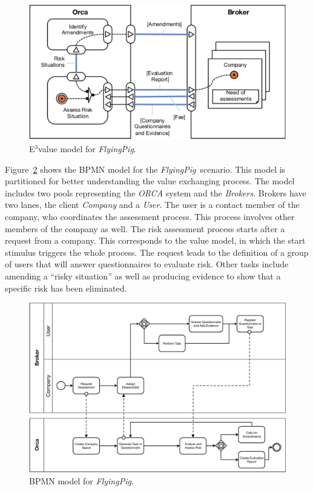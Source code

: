\documentclass{singlecol-new}
\theoremstyle{TH}{
\newtheorem{lemma}{Lemma}
\newtheorem{theorem}[lemma]{Theorem}
\newtheorem{corrolary}[lemma]{Corrolary}
\newtheorem{conjecture}[lemma]{Conjecture}
\newtheorem{proposition}[lemma]{Proposition}
\newtheorem{claim}[lemma]{Claim}
\newtheorem{stheorem}[lemma]{Wrong Theorem}
\newtheorem{algorithm}{Algorithm}
}
\theoremstyle{THrm}{
\newtheorem{definition}{Definition}[section]
\newtheorem{question}{Question}[section]
\newtheorem{remark}{Remark}
\newtheorem{scheme}{Scheme}
}
\theoremstyle{THhit}{
\newtheorem{case}{Case}[section]
}
\theoremstyle{THhsl}{
\newtheorem{example}{Example}
}
\def\FlyingPig{\textsl{FlyingPig}\xspace}
\begin{document}
\begin{figure}[h]
\centering
\includegraphics[width=1\textwidth]{./figures/3ValueModel.pdf}
\caption{E$^3$value model for \FlyingPig.\label{fig:E3valuemodel}}
\end{figure}

Figure~\ref{fig:BPMNmodel} shows the BPMN model
for the \FlyingPig\ scenario. This model is partitioned for better understanding the value exchanging process.
The model includes two pools representing the \textsl{ORCA} system and the \textsl{Brokers}.
Brokers have two lanes, the client \textsl{Company} and a \textsl{User}.
The user is a contact member of the company, who  coordinates the assessment process.
This process  involves other members of the company as well.
%
The risk assessment process starts after a request from a company.
This corresponds to the value model, in which the start stimulus triggers the whole process.
The request leads to the definition of a group of users that will answer questionnaires to evaluate risk.
Other tasks include amending a ``risky situation'' as well as producing evidence to show that a specific risk has been eliminated\footnotemark {}.

\begin{figure}[h]
\centering
\includegraphics[width=1\textwidth]{./figures/BPMN_GCP.pdf}
\caption{BPMN model for \FlyingPig.\label{fig:BPMNmodel}}
\end{figure}
\end{document}
